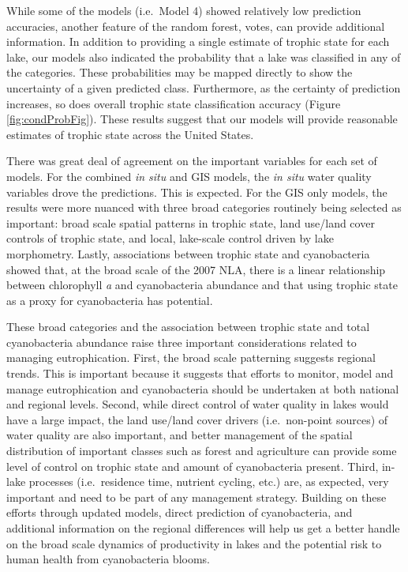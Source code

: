 \documentclass[11pt,]{article}
\begin{document}
While some of the models (i.e.~Model 4) showed relatively low prediction
accuracies, another feature of the random forest, votes, can provide
additional information. In addition to providing a single estimate of
trophic state for each lake, our models also indicated the probability
that a lake was classified in any of the categories. These probabilities
may be mapped directly to show the uncertainty of a given predicted
class. Furthermore, as the certainty of prediction increases, so does
overall trophic state classification accuracy (Figure
\ref{fig:condProbFig}). These results suggest that our models will
provide reasonable estimates of trophic state across the United States.

There was great deal of agreement on the important variables for each
set of models. For the combined \emph{in situ} and GIS models, the
\emph{in situ} water quality variables drove the predictions. This is
expected. For the GIS only models, the results were more nuanced with
three broad categories routinely being selected as important: broad
scale spatial patterns in trophic state, land use/land cover controls of
trophic state, and local, lake-scale control driven by lake morphometry.
Lastly, associations between trophic state and cyanobacteria showed
that, at the broad scale of the 2007 NLA, there is a linear relationship
between chlorophyll \emph{a} and cyanobacteria abundance and that using
trophic state as a proxy for cyanobacteria has potential.

These broad categories and the association between trophic state and
total cyanobacteria abundance raise three important considerations
related to managing eutrophication. First, the broad scale patterning
suggests regional trends. This is important because it suggests that
efforts to monitor, model and manage eutrophication and cyanobacteria
should be undertaken at both national and regional levels. Second, while
direct control of water quality in lakes would have a large impact, the
land use/land cover drivers (i.e.~non-point sources) of water quality
are also important, and better management of the spatial distribution of
important classes such as forest and agriculture can provide some level
of control on trophic state and amount of cyanobacteria present. Third,
in-lake processes (i.e.~residence time, nutrient cycling, etc.) are, as
expected, very important and need to be part of any management strategy.
Building on these efforts through updated models, direct prediction of
cyanobacteria, and additional information on the regional differences
will help us get a better handle on the broad scale dynamics of
productivity in lakes and the potential risk to human health from
cyanobacteria blooms.
\end{document}
